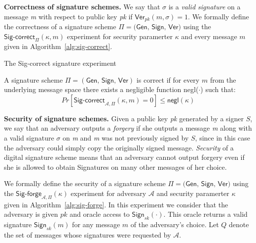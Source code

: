 \noindent
\textbf{Correctness of signature schemes.}
We say that $\sigma$ is a \emph{valid signature} on a message \emph{m} with respect to public key \emph{pk} if $\textsf{Ver}_{pk}(m,\sigma) = 1$. We formally define the correctness of a signature scheme $\Pi = \textsf{(Gen, Sign, Ver)}$ using the $\textsf{Sig-correct}_{\Pi}(\kappa, m)$ experiment for security paramerter $\kappa$ and every message $m$ given in Algorithm~\ref{alg:sig-correct}.

\begin{algorithm}[h]
		\caption{\label{alg:sig-correct} The \textsf{Sig-correct} signature experiment}
		\begin{algorithmic}[1]
					\State{}
				\EndIf
				\State{}
			\EndFunction
		\end{algorithmic}
\end{algorithm}

\begin{defn}
	\label{def:singature_correctness}
	A signature scheme $\Pi = (\textsf{Gen, Sign, Ver})$ is correct if for every $m$ from the underlying message space there exists a negligible function \textsf{negl($\cdot$)} such that:
	\begin{equation*}
		Pr[\textsf{Sig-correct}_{\mathcal{A}, \Pi}(\kappa, m) = 0] \leq \textsf{negl}(\kappa)
	\end{equation*}
\end{defn}

\noindent
\textbf{Security of signature schemes.}
Given a public key \emph{pk} generated by a signer $S$, we say that an adversary outputs a \emph{forgery} if she outputs a message \emph{m} along with a valid signature $\sigma$ on \emph{m} and \emph{m} was not previously signed by $S$, since in this case the adversary could simply copy the originally signed message. \emph{Security} of a digital signature scheme means that an adversary cannot output forgery even if she is allowed to obtain Signatures on many other messages of her choice.

We formally define the security of a signature scheme $\Pi = \textsf{(Gen, Sign, Ver)}$ using the $\textsf{Sig-forge}_{\mathcal{A}, \Pi}(\kappa)$ experiment for adversary $\mathcal{A}$ and security paramerter $\kappa$ given in Algorithm~\ref{alg:sig-forge}. 
In this experiment we consider that the adversary is given $pk$ and oracle access to $\textsf{Sign}_{sk}(\cdot)$. This oracle returns a valid signature $\textsf{Sign}_{sk}(m)$ for any message $m$ of the adversary's choice. Let $Q$ denote the set of messages whose signatures were requested by $\mathcal{A}$.

